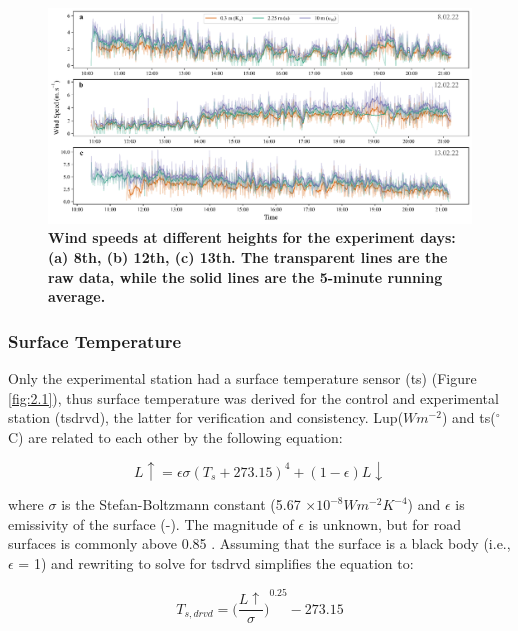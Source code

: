\documentclass[final,3p,times,authoryear]{elsarticle}
\begin{document}
\begin{figure}
\centering
\includegraphics[trim={0 0 0 0},clip,scale=1.0]{pict024.png}
\caption{\bf Wind speeds at different heights for the experiment days: (a) 8th, (b) 12th, (c) 13th. The transparent lines are the raw data, while the solid lines are the 5-minute running average.}
 \label{fig:7.7}
\end{figure}



\subsubsection{Surface Temperature}\label{sec:appendix7.4.2}

Only the experimental station had a surface temperature sensor (\gls{ts}) (Figure \ref{fig:2.1}), thus surface temperature was derived for the control and experimental station (\gls{tsdrvd}), the latter for verification and consistency. \gls{Lup}($Wm^{-2}$) and \gls{ts}($^{\circ}$C) are related to each other by the following equation:

\begin{equation}
L\uparrow = \epsilon \sigma (T_{s} + 273.15)^{4} + (1 - \epsilon) L\downarrow
\label{eq:7.5}
\end{equation}

where $\sigma$ is the Stefan-Boltzmann constant (5.67 $\times 10^{-8} Wm^{-2}K^{-4}$) and $\epsilon$ is emissivity of the surface (-). The magnitude of $\epsilon$ is unknown, but for road surfaces is commonly above 0.85 \citep{Oke2017}. Assuming that the surface is a black body (i.e., $\epsilon$ = 1) and rewriting to solve for \gls{tsdrvd} simplifies the equation to:

\begin{equation}
T_{s,drvd} =  { \bigg( \frac{  L\uparrow } {\sigma}   \bigg) }^{0.25} - 273.15
\label{eq:7.6}
\end{equation}
\end{document}
